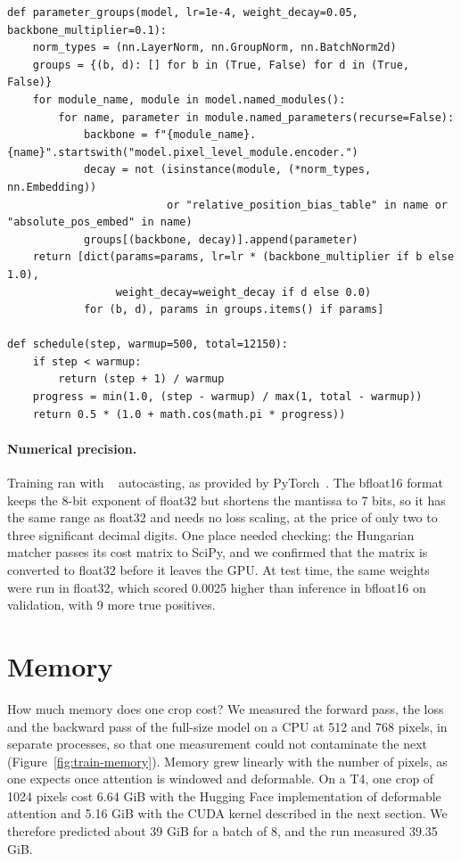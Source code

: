 \begin{lstlisting}[caption={Parameter groups and the schedule. Condensed from
\file{experiments/exp\_139\_mask2former/src/model.py} and \file{train.py}.},label=lst:train-groups]
def parameter_groups(model, lr=1e-4, weight_decay=0.05, backbone_multiplier=0.1):
    norm_types = (nn.LayerNorm, nn.GroupNorm, nn.BatchNorm2d)
    groups = {(b, d): [] for b in (True, False) for d in (True, False)}
    for module_name, module in model.named_modules():
        for name, parameter in module.named_parameters(recurse=False):
            backbone = f"{module_name}.{name}".startswith("model.pixel_level_module.encoder.")
            decay = not (isinstance(module, (*norm_types, nn.Embedding))
                         or "relative_position_bias_table" in name or "absolute_pos_embed" in name)
            groups[(backbone, decay)].append(parameter)
    return [dict(params=params, lr=lr * (backbone_multiplier if b else 1.0),
                 weight_decay=weight_decay if d else 0.0)
            for (b, d), params in groups.items() if params]

def schedule(step, warmup=500, total=12150):
    if step < warmup:
        return (step + 1) / warmup
    progress = min(1.0, (step - warmup) / max(1, total - warmup))
    return 0.5 * (1.0 + math.cos(math.pi * progress))
\end{lstlisting}

\paragraph{Numerical precision.} Training ran with ~\citep{kalamkar2019}
autocasting, as provided by PyTorch~\citep{paszke2019}. The bfloat16
format keeps the 8-bit exponent of float32 but shortens the mantissa to 7 bits, so it has the same
range as float32 and needs no loss scaling, at the price of only two to three significant decimal
digits. One place needed checking: the Hungarian matcher passes its cost matrix to SciPy, and we
confirmed that the matrix is converted to float32 before it leaves the GPU. At test time, the same
weights were run in float32, which scored 0.0025 higher than inference in bfloat16 on validation, with
9 more true positives.

\section{Memory}\label{sec:train-memory}
How much memory does one crop cost? We measured the forward pass, the loss and the backward pass of the
full-size model on a CPU at 512 and 768 pixels, in separate processes, so that one measurement could not
contaminate the next (Figure~\ref{fig:train-memory}). Memory grew linearly with the number of pixels,
as one expects once attention is windowed and deformable. On a T4, one crop of 1024 pixels cost 6.64 GiB
with the Hugging Face implementation of deformable attention and 5.16 GiB with the CUDA kernel described
in the next section. We therefore predicted about 39 GiB for a batch of 8, and the run measured
39.35 GiB.

